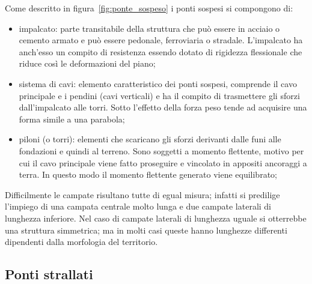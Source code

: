 Come descritto in figura~\ref{fig:ponte_sospeso} i ponti sospesi si compongono di:
\begin{itemize}
	\item impalcato: parte transitabile della struttura che può essere in acciaio o cemento armato e può essere pedonale, ferroviaria o stradale. L'impalcato ha anch'esso un compito di resistenza essendo dotato di rigidezza flessionale che riduce così le deformazioni del piano;
	\item sistema di cavi: elemento caratteristico dei ponti sospesi, comprende il cavo principale e i pendini (cavi verticali) e ha il compito di trasmettere gli sforzi dall'impalcato alle torri. Sotto l'effetto della forza peso tende ad acquisire una forma simile a una parabola;
	\item piloni (o torri): elementi che scaricano gli sforzi derivanti dalle funi  alle fondazioni e quindi al terreno. Sono soggetti a momento flettente, motivo per cui il cavo principale viene fatto proseguire e vincolato in appositi ancoraggi a terra. In questo modo il momento flettente generato viene equilibrato;
\end{itemize}

Difficilmente le campate risultano tutte di egual misura; infatti si predilige l'impiego di una campata centrale molto lunga e due campate laterali di lunghezza inferiore.
Nel caso di campate laterali di lunghezza uguale si otterrebbe una struttura simmetrica; ma in molti casi queste hanno lunghezze differenti dipendenti dalla morfologia del territorio.

\subsection{Ponti strallati}


